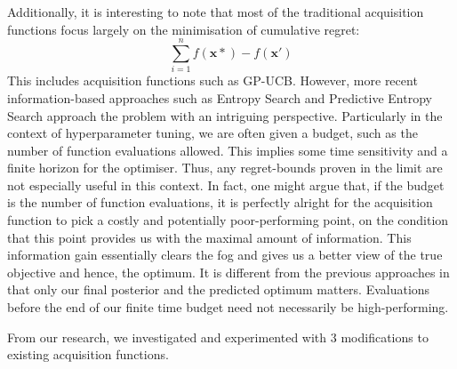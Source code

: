 \documentclass[letterpaper]{article}
\begin{document}
Additionally, it is interesting to note that most of the traditional acquisition
functions focus largely on the minimisation of cumulative regret:
$$\sum_{i=1}^{n} f(\textbf{x}*) - f(\textbf{x}')$$
This includes acquisition functions such as GP-UCB. However, more recent
information-based approaches such as Entropy Search \cite{hennig2012entropy} and
Predictive Entropy Search \cite{hernandez2014predictive} approach the problem with an intriguing perspective.
Particularly in the context of hyperparameter tuning, we are often given a budget,
such as the number of function evaluations allowed. This implies some time sensitivity
and a finite horizon for the optimiser. Thus, any regret-bounds proven in the limit
are not especially useful in this context. In fact, one might argue that, if the
budget is the number of function evaluations, it is perfectly alright for the
acquisition function to pick a costly and potentially poor-performing point,
on the condition that this point provides us with the maximal amount of information.
This information gain essentially clears the fog and gives us a better view of the
true objective and hence, the optimum. It is different from the previous approaches
in that only our final posterior and the predicted optimum matters. Evaluations
before the end of our finite time budget need not necessarily be high-performing.

From our research, we investigated and experimented with 3 modifications to existing
acquisition functions.
\end{document}
